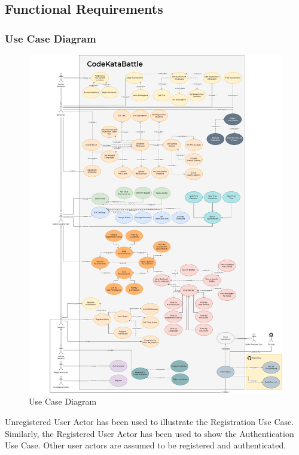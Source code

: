 \subsection{Functional Requirements}
\subsubsection{Use Case Diagram}
\label{sec:Use Case Diagram}

\begin{figure}[H]
    \centering
    \includegraphics[scale=0.25]{Images/usecasefinal.drawio.png}
    \caption{Use Case Diagram}
\end{figure}


Unregistered User Actor has been used to illustrate the Registration Use Case. Similarly, the Registered User Actor has been used to show the Authentication Use Case. Other user actors are assumed to be registered and authenticated.

\\

